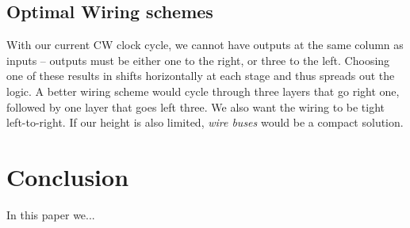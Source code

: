 \documentclass[letterpaper, 10 pt, conference]{ieeeconf}
\newcommand{\todo}[1]{\vspace{5 mm}\par \noindent \framebox{\begin{minipage}[c]{0.98 \columnwidth} \ttfamily\flushleft \textcolor{red}{#1}\end{minipage}}\vspace{5 mm}\par}
\begin{document}
\todo{These are comparable to a ripple-carry adder:  the delay for $n$ bits is  and requires $x=$ gates.
Numerous other schemes exist to speed up the computation.  The advantage of gates is that they are easily reused and connected.  If speed was critical, instead of using discrete gates, we could engineer the workspace to directly compute logic.  }

\subsection{Optimal Wiring schemes}\label{sec:wiring}
With our current CW clock cycle, we cannot have outputs at the same column as inputs -- outputs must be either one to the right, or three to the left.  Choosing one of these results in shifts horizontally at each stage and thus spreads out the logic. A better wiring scheme would cycle through three layers that go right one, followed by one layer that goes left three.  We also want the wiring to be tight left-to-right.  If our height is also limited, \emph{wire buses} would be a compact solution. 

\section{Conclusion}
In this paper we...

    
   


\newpage    
    
\end{document}
